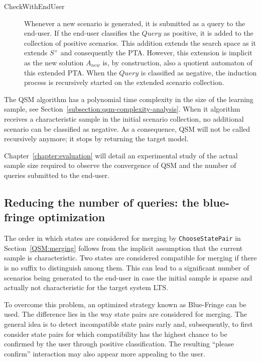 \begin{description}
\item[CheckWithEndUser] Whenever a new scenario is generated, it is submitted as a query to the end-user. If the end-user classifies the $Query$ as positive, it is added to the collection of positive scenarios. This addition extends the search space as it extends $S^+$ and consequently the PTA. However, this extension is implicit as the new solution $A_{new}$ is, by construction, also a quotient automaton of this extended PTA. When the $Query$ is classified as negative, the induction process is recursively started on the extended scenario collection.

\end{description}

The QSM algorithm has a polynomial time complexity in the size of the learning sample, see Section~\ref{subsection:qsm-complexity-analysis}. When it algorithm receives a characteristic sample in the initial scenario collection, no additional scenario can be classified as negative. As a consequence, QSM will not be called recursively anymore; it stops by returning the target model. 

Chapter~\ref{chapter:evaluation} will detail an experimental study of the actual sample size required to observe the convergence of \textsc{QSM} and the number of queries submitted to the end-user.

\subsection{Reducing the number of queries: the blue-fringe optimization\label{BlueFringe}}

The order in which states are considered for merging by \texttt{ChooseStatePair} in Section~\ref{QSM:merging} follows from the implicit assumption that the current sample is characteristic. Two states are considered compatible for merging if there is no suffix to distinguish among them. This can lead to a significant number of scenarios being generated to the end-user in case the initial sample is sparse and actually not characteristic for the target system LTS. 

To overcome this problem, an optimized strategy known as Blue-Fringe \cite{Lang:1998} can be used. The difference lies in the way state pairs are considered for merging. The general idea is to detect incompatible state pairs early and, subsequently, to first consider state pairs for which compatibility has the highest chance to be confirmed by the user through positive classification. The resulting ``please confirm'' interaction may also appear more appealing to the user.

